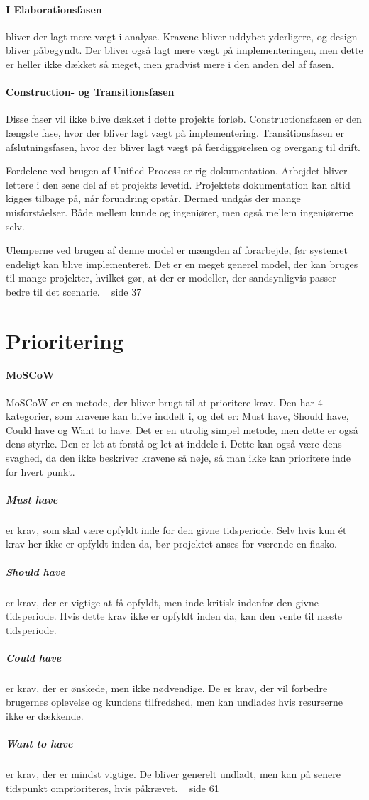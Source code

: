 \paragraph{I Elaborationsfasen} bliver der lagt mere vægt i analyse. Kravene bliver uddybet yderligere, og design bliver påbegyndt. Der bliver også lagt mere vægt på implementeringen, men dette er heller ikke dækket så meget, men gradvist mere i den anden del af fasen.

\paragraph{Construction- og Transitionsfasen} Disse faser vil ikke blive dækket i dette projekts forløb. Constructionsfasen er den længste fase, hvor der bliver lagt vægt på implementering. Transitionsfasen er afslutningsfasen, hvor der bliver lagt vægt på færdiggørelsen og overgang til drift.
 
Fordelene ved brugen af Unified Process er rig dokumentation. Arbejdet bliver lettere i den sene del af et projekts levetid. Projektets dokumentation kan altid kigges tilbage på, når forundring opstår. Dermed undgås der mange misforståelser. Både mellem kunde og ingeniører, men også mellem ingeniørerne selv.

Ulemperne ved brugen af denne model er mængden af forarbejde, før systemet endeligt kan blive implementeret. Det er en meget generel model, der kan bruges til mange projekter, hvilket gør, at der er modeller, der sandsynligvis passer bedre til det scenarie. ~\cite{A&N} side 37

\section{Prioritering}
\paragraph{MoSCoW}
MoSCoW er en metode, der bliver brugt til at prioritere krav. Den har 4 kategorier, som kravene kan blive inddelt i, og det er: Must have, Should have, Could have og Want to have. Det er en utrolig simpel metode, men dette er også dens styrke. Den er let at forstå og let at inddele i. Dette kan også være dens svaghed, da den ikke beskriver kravene så nøje, så man ikke kan prioritere inde for hvert punkt.

\subparagraph{Must have}er krav, som skal være opfyldt inde for den givne tidsperiode. Selv hvis kun ét krav her ikke er opfyldt inden da, bør projektet anses for værende en fiasko.
\subparagraph{Should have}er krav, der er vigtige at få opfyldt, men inde kritisk indenfor den givne tidsperiode. Hvis dette krav ikke er opfyldt inden da, kan den vente til næste tidsperiode.
\subparagraph{Could have}er krav, der er ønskede, men ikke nødvendige. De er krav, der vil forbedre brugernes oplevelse og kundens tilfredshed, men kan undlades hvis resurserne ikke er dækkende.
\subparagraph{Want to have}er krav, der er mindst vigtige. De bliver generelt undladt, men kan på senere tidspunkt omprioriteres, hvis påkrævet. ~\cite{A&N} side 61

